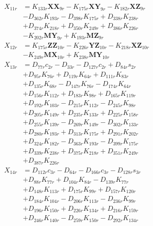 \begin{multicols}{2}
\begin{align}
X_{11r} &= K_{133r}\mathbf{XX}_{9r} - K_{175r}\mathbf{XY}_{9r} - K_{182r}\mathbf{XZ}_{9r}  \nonumber \\
&- D_{362r}K_{193r} - D_{398r}K_{175r} + D_{338r}K_{238r}  \nonumber \\
&+ D_{374r}K_{218r} + D_{350r}K_{249r} + D_{386r}K_{226r}  \nonumber \\
&- K_{202r}\mathbf{MY}_{9r} + K_{193r}\mathbf{MZ}_{9r} \nonumber \\
X_{12r} &= K_{175r}\mathbf{ZZ}_{10r} - K_{226r}\mathbf{YZ}_{10r} - K_{218r}\mathbf{XZ}_{10r}  \nonumber \\
&- K_{249r}\mathbf{MX}_{10r} + K_{238r}\mathbf{MY}_{10r} \nonumber \\
X_{13r} &= D_{77r}c_{2r} - D_{33r} - D_{127r}c_{2r} + D_{84r}s_{2r}  \nonumber \\
&+ D_{95r}K_{76r} + D_{119r}K_{64r} + D_{111r}K_{83r}  \nonumber \\
&+ D_{135r}K_{68r} - D_{147r}K_{76r} - D_{174r}K_{64r}  \nonumber \\
&+ D_{156r}K_{112r} + D_{183r}K_{98r} + D_{165r}K_{119r}  \nonumber \\
&+ D_{192r}K_{103r} - D_{215r}K_{112r} - D_{245r}K_{98r}  \nonumber \\
&+ D_{205r}K_{149r} + D_{235r}K_{133r} + D_{225r}K_{158r}  \nonumber \\
&+ D_{255r}K_{139r} - D_{269r}K_{149r} - D_{302r}K_{133r}  \nonumber \\
&+ D_{280r}K_{193r} + D_{313r}K_{175r} + D_{291r}K_{202r}  \nonumber \\
&+ D_{324r}K_{182r} - D_{363r}K_{193r} - D_{399r}K_{175r}  \nonumber \\
&+ D_{339r}K_{238r} + D_{375r}K_{218r} + D_{351r}K_{249r}  \nonumber \\
&+ D_{387r}K_{226r} \nonumber \\
X_{14r} &= D_{112r}c_{3r} - D_{64r} - D_{166r}c_{3r} - D_{128r}s_{3r}  \nonumber \\
&+ D_{88r}K_{77r} + D_{104r}K_{84r} - D_{139r}K_{77r}  \nonumber \\
&+ D_{148r}K_{113r} + D_{175r}K_{99r} + D_{157r}K_{120r}  \nonumber \\
&+ D_{184r}K_{104r} - D_{206r}K_{113r} - D_{236r}K_{99r}  \nonumber \\
&+ D_{196r}K_{150r} + D_{226r}K_{134r} + D_{216r}K_{159r}  \nonumber \\
&+ D_{246r}K_{140r} - D_{259r}K_{150r} - D_{292r}K_{134r}  \nonumber \\

\end{align}
\end{multicols}
